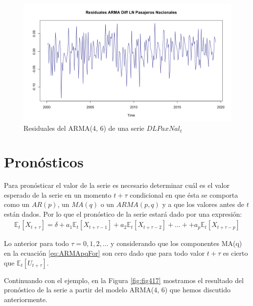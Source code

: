\documentclass[
]{book}
\begin{document}
\begin{figure}

{\centering \includegraphics[width=0.95\linewidth]{Plots/G_Residuals_ARMA46_D} 

}

\caption{Residuales del ARMA(4, 6) de una serie $DLPaxNal_t$}\label{fig:fig416}
\end{figure}

\hypertarget{pronuxf3sticos}{%
\section{Pronósticos}\label{pronuxf3sticos}}

Para pronósticar el valor de la serie es necesario determinar cuál es el valor esperado de la serie en un momento \(t + \tau\) condicional en que ésta se comporta como un \(AR(p)\), un \(MA(q)\) o un \(ARMA(p, q)\) y a que los valores antes de \(t\) están dados. Por lo que el pronóstico de la serie estará dado por una expresión:
\begin{eqnarray}
    \mathbb{E}_t[X_{t+\tau}] = \delta + a_1 \mathbb{E}_t[X_{t+\tau-1}] + a_2 \mathbb{E}_t[X_{t+\tau-2}] + \ldots + + a_p \mathbb{E}_t[X_{t+\tau-p}]
    \label{eq:ARMApqFor}
\end{eqnarray}

Lo anterior para todo \(\tau = 0, 1, 2, \ldots\) y considerando que los componentes MA(q) en la ecuación \eqref{eq:ARMApqFor} son cero dado que para todo valor \(t + \tau\) es cierto que \(\mathbb{E}_t[U_{t+\tau}]\).

Continuando con el ejemplo, en la Figura \ref{fig:fig417} mostramos el resultado del pronóstico de la serie a partir del modelo ARMA(4, 6) que hemos discutido anteriormente.
\end{document}
